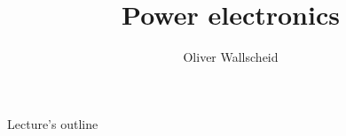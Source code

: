 \documentclass{../course_template/lectureClass}
\title[Power electronics]{Power electronics}
\author{Oliver Wallscheid}
\date{}
\begin{document}

\begin{frame}[plain]
    \titlepage
\end{frame}

\begin{frame}{Lecture's outline}
    \tableofcontents[hideallsubsections]
\end{frame}


\end{document}
